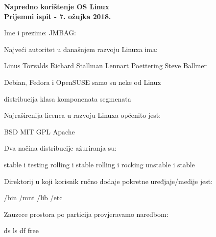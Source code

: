 \documentclass[a4paper,11pt]{exam}
\begin{document}
\firstpageheader
	{}
	{{\large \textbf{Napredno korištenje OS Linux}}\\
		\textbf{Prijemni ispit - 7. ožujka 2018.}}
	{}
\footer
	{}{}{\thepage}
	
Ime i prezime: \fillin[][7cm] \hfill JMBAG: \fillin[][5cm]\\

\begin{questions}
	\question
	Najveći autoritet u današnjem razvoju Linuxa ima:
	
	\begin{oneparchoices}
		\CorrectChoice Linus Torvalds
		\choice Richard Stallman
		\choice Lennart Poettering
		\choice Steve Ballmer
	\end{oneparchoices}
	
	\question
	Debian, Fedora i OpenSUSE samo su neke od Linux
	
	\begin{oneparchoices}
		\CorrectChoice distribucija
		\choice klasa
		\choice komponenata
		\choice segmenata
	\end{oneparchoices}
	
	\question
	Najraširenija licenca u razvoju Linuxa općenito jest:
	
	\begin{oneparchoices}
		\choice BSD
		\choice MIT
		\CorrectChoice GPL
		\choice Apache
	\end{oneparchoices}
	
	\question
  Dva načina distribucije ažuriranja su: 

	\begin{oneparchoices}
		    \choice stable i testing
        \CorrectChoice rolling i stable 
        \choice rolling i rocking
        \choice unstable i stable
	\end{oneparchoices}

	\question
  Direktorij u koji korisnik ručno dodaje pokretne uređjaje/medije jest:
	
	\begin{oneparchoices}
        \choice /bin
        \CorrectChoice /mnt
        \choice /lib
        \choice /etc
	\end{oneparchoices}
	
	\question
Zauzece prostora po particija provjeravamo naredbom:
	
	\begin{oneparchoices}
		\choice ds 
		\choice ls 
		\CorrectChoice df 
		\choice free
	\end{oneparchoices}
	

\end{questions}
\end{document}

